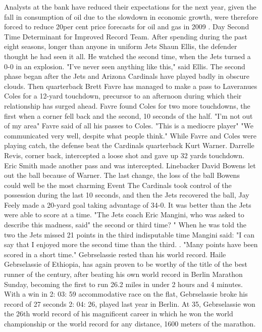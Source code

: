 Analysts at the bank have reduced their expectations for the next year, given the fall in consumption of oil due to the slowdown in economic growth, were therefore forced to reduce 20per cent price forecasts for oil and gas in 2009 .
Day Second Time Determinant for Improved Record Team.
After spending during the past eight seasons, longer than anyone in uniform Jets Shaun Ellis, the defender thought he had seen it all.
He watched the second time, when the Jets turned a 0-0 in an explosion.
"I've never seen anything like this," said Ellis.
The second phase began after the Jets and Arizona Cardinals have played badly in obscure clouds.
Then quarterback Brett Favre has managed to make a pass to Laveranues Coles for a 12-yard touchdown, precursor to an afternoon during which their relationship has surged ahead.
Favre found Coles for two more touchdowns, the first when a corner fell back and the second, 10 seconds of the half.
"I'm not out of my area" Favre said of all his passes to Coles.
"This is a mediocre player"
"We communicated very well, despite what people think."
While Favre and Coles were playing catch, the defense beat the Cardinals quarterback Kurt Warner.
Darrelle Revis, corner back, intercepted a loose shot and gave up 32 yards touchdown.
Eric Smith made another pass and was intercepted.
Linebacker David Bowens let out the ball because of Warner.
The last change, the loss of the ball Bowens could well be the most charming Event
The Cardinals took control of the possession during the last 10 seconds, and then the Jets recovered the ball, Jay Feely made a 20-yard goal taking advantage of 34-0.
It was better than the Jets were able to score at a time.
"The Jets coach Eric Mangini, who was asked to describe this madness, said" the second or third time? "
When he was told the two the Jets missed 21 points in the third indisputable time Mangini said: "I can say that I enjoyed more the second time than the third.
. "Many points have been scored in a short time."
Gebrselassie rested than his world record.
Haile Gebrselassie of Ethiopia, has again proven to be worthy of the title of the best runner of the century, after beating his own world record in Berlin Marathon Sunday, becoming the first to run 26.2 miles in under 2 hours and 4 minutes.
With a win in 2: 03: 59 accommodative race on the flat, Gebrselassie broke his record of 27 seconds 2: 04: 26, played last year in Berlin.
At 35, Gebrselassie won the 26th world record of his magnificent career in which he won the world championship or the world record for any distance, 1600 meters of the marathon.
